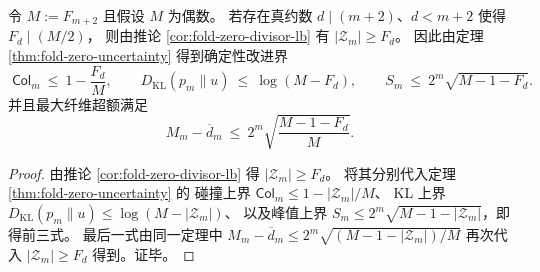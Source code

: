 \begin{corollary}\label{cor:fold-zero-divisor-triple-reduction}
令 \(M:=F_{m+2}\) 且假设 \(M\) 为偶数。
若存在真约数 \(d\mid (m+2)\)、\(d<m+2\) 使得 \(F_d\mid (M/2)\)，
则由推论 \ref{cor:fold-zero-divisor-lb} 有 \(|\mathcal{Z}_m|\ge F_d\)。
因此由定理 \ref{thm:fold-zero-uncertainty} 得到确定性改进界
\[
\boxed{\;
\mathsf{Col}_m\ \le\ 1-\frac{F_d}{M},\qquad
D_{\mathrm{KL}}(p_m\|u)\ \le\ \log(M-F_d),\qquad
S_m\ \le\ 2^m\sqrt{M-1-F_d}.\;}
\]
并且最大纤维超额满足
\[
M_m-\overline d_m\ \le\ 2^m\sqrt{\frac{M-1-F_d}{M}}.
\]
\end{corollary}
\begin{proof}
由推论 \ref{cor:fold-zero-divisor-lb} 得 \(|\mathcal{Z}_m|\ge F_d\)。
将其分别代入定理 \ref{thm:fold-zero-uncertainty} 的
碰撞上界 \(\mathsf{Col}_m\le 1-|\mathcal{Z}_m|/M\)、
KL 上界 \(D_{\mathrm{KL}}(p_m\|u)\le \log(M-|\mathcal{Z}_m|)\)、
以及峰值上界 \(S_m\le 2^m\sqrt{M-1-|\mathcal{Z}_m|}\)，即得前三式。
最后一式由同一定理中 \(M_m-\overline d_m\le 2^m\sqrt{(M-1-|\mathcal{Z}_m|)/M}\) 再次代入 \(|\mathcal{Z}_m|\ge F_d\) 得到。证毕。
\end{proof}
